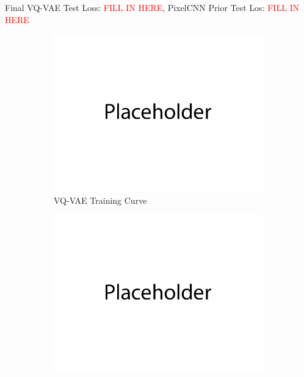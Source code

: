 \documentclass{article}
\begin{document}
\newpage
{}

Final VQ-VAE Test Loss: \textcolor{red}{FILL IN HERE}, PixelCNN Prior Test Los: \textcolor{red}{FILL IN HERE}
\begin{figure}[H]
       \centering
       \begin{subfigure}[b]{0.475\textwidth}
           \centering
           \includegraphics[width=\textwidth]{figures/q3_vqvae_train_plot.png}
           \caption{VQ-VAE Training Curve}
       \end{subfigure}
       \hfill
       \begin{subfigure}[b]{0.475\textwidth}
           \centering
           \includegraphics[width=\textwidth]{figures/q3_pixelcnn_train_plot.png}

\end{subfigure}
\end{figure}
\end{document}
